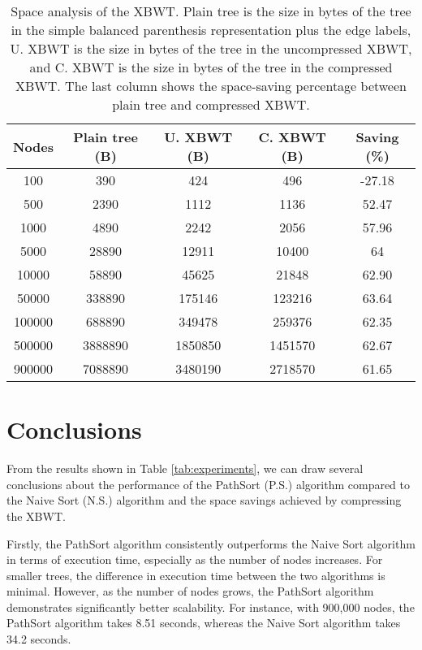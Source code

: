 \begin{table}[h]
    \centering
    \begin{tabular}{|c|c|c|c|c|}
        \hline
        \textbf{Nodes} & \textbf{Plain tree (B)} & \textbf{U. XBWT (B)} & \textbf{C. XBWT (B)} & \textbf{Saving (\%)} \\
        \hline
        100 & 390 & 424 & 496 & -27.18 \\
        500 & 2390 & 1112 & 1136 & 52.47 \\
        1000 & 4890 & 2242 & 2056 & 57.96 \\
        5000 & 28890 & 12911 & 10400 & 64 \\
        10000 & 58890 & 45625 & 21848 & 62.90 \\
        50000 & 338890 & 175146 & 123216 & 63.64 \\
        100000 & 688890 & 349478 & 259376 & 62.35 \\
        500000 & 3888890 & 1850850 & 1451570 & 62.67 \\
        900000 & 7088890 & 3480190 & 2718570 & 61.65 \\
        \hline
    \end{tabular}
    \caption{Space analysis of the XBWT. Plain tree is the size in bytes of the tree in the simple balanced parenthesis representation plus the edge labels, U. XBWT is the size in bytes of the tree in the uncompressed XBWT, and C. XBWT is the size in bytes of the tree in the compressed XBWT. The last column shows the space-saving percentage between plain tree and compressed XBWT.}
    \label{tab:experiments_2}
\end{table}

\section{Conclusions}
From the results shown in Table \ref{tab:experiments}, we can draw several conclusions about the performance of the PathSort (P.S.) algorithm compared to the Naive Sort (N.S.) algorithm and the space savings achieved by compressing the XBWT.

Firstly, the PathSort algorithm consistently outperforms the Naive Sort algorithm in terms of execution time, especially as the number of nodes increases. For smaller trees, the difference in execution time between the two algorithms is minimal. However, as the number of nodes grows, the PathSort algorithm demonstrates significantly better scalability. For instance, with 900,000 nodes, the PathSort algorithm takes 8.51 seconds, whereas the Naive Sort algorithm takes 34.2 seconds.

